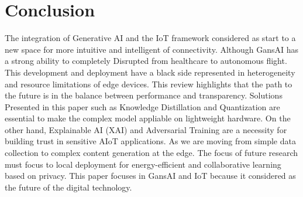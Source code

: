 \documentclass[journal]{IEEEtran}
\begin{document}
\section{Conclusion}
The integration of Generative AI and the IoT framework considered as start to a new space for   more intuitive and intelligent of connectivity. Although GansAI has a strong ability to completely Disrupted from healthcare to autonomous flight. This development and deployment have a black side represented in heterogeneity and resource limitations of edge devices.
This review highlights that the path to the future is in the balance between performance and transparency. Solutions Presented in this paper such as Knowledge Distillation and Quantization are essential to make the complex model appliable on lightweight hardware. On the other hand, Explainable AI (XAI) and Adversarial Training are a necessity for building trust in sensitive AIoT applications. As we are moving from simple data collection to complex content generation at the edge. The focus of future research must focus to local deployment for energy-efficient and collaborative learning based on privacy. This paper focuses in GansAI and IoT because it considered as the future of the digital technology.
\end{document}
